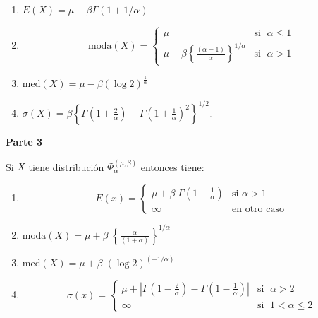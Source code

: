 \documentclass[
]{book}
\theoremstyle{definition}
\theoremstyle{definition}
\theoremstyle{definition}
\theoremstyle{definition}
\theoremstyle{remark}
\begin{document}
\begin{enumerate}
\def\labelenumi{\alph{enumi})}
\item
  \(E(X)=\mu -\beta \Gamma (1+1/\alpha)\)
\item
  \begin{equation*}\text{moda}(X) =\begin{cases} 
    \mu  & \text{si }\; \alpha \leq 1 \\
   \mu-\beta\left\{ \frac{\left( \alpha-1 \right)}{\alpha} \right\}^{1/\alpha} & \text{si }\; \alpha >1
  \end{cases}\end{equation*}
\item
  \(\text{med}(X)=\mu - \beta (\log 2)^{\frac{1}{\alpha}}\)
\item
  \(\sigma(X)=\beta\left\{\Gamma\left( 1+\frac{2}{\alpha} \right)-\Gamma\left( 1+\frac{1}{\alpha} \right)^2  \right\}^{1/2}\).
\end{enumerate}

\textbf{Parte 3}

Si \(X\) tiene distribución \(\Phi_{\alpha}^{(\mu, \beta)}\) entonces tiene:

\begin{enumerate}
\def\labelenumi{\alph{enumi})}
\item
  \begin{equation*}
  E(x) =
  \begin{cases} 
   \mu + \beta\;\Gamma\left( 1-\frac{1}{\alpha} \right) & \text{si } \alpha>1 \\
   \infty & \text{en otro caso}
  \end{cases}
  \end{equation*}
\item
  \(\text{moda}(X)=\mu+ \beta\;\left\{ \frac{\alpha}{\left( 1+ \alpha\right)}\right\}^{1/\alpha}\)
\item
  \(\text{med}(X)=\mu + \beta \;\left( \log 2 \right)^{\left( -1/\alpha \right)}\)
\item
  \begin{equation*}
  \sigma(x) =
  \begin{cases} 
   \mu + \left| \Gamma \left( 1 - \frac{2}{\alpha} \right) - \Gamma \left(  1 - \frac{1}{\alpha}\right)\right|  & \text{si } \; \alpha>2 \\
   \infty & \text{si } \; 1<\alpha \leq 2
  \end{cases}
  \end{equation*}
\end{enumerate}
\end{document}
